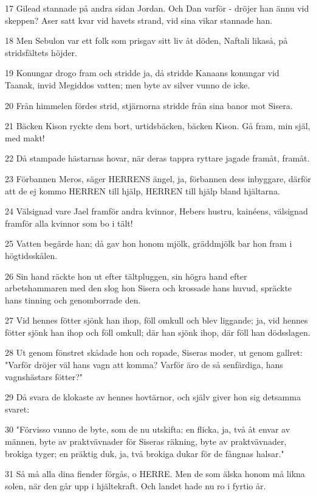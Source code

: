 \par 17 Gilead stannade på andra sidan Jordan. Och Dan varför - dröjer han ännu vid skeppen? Aser satt kvar vid havets strand, vid sina vikar stannade han.
\par 18 Men Sebulon var ett folk som prisgav sitt liv åt döden, Naftali likaså, på stridsfältets höjder.
\par 19 Konungar drogo fram och stridde ja, då stridde Kanaans konungar vid Taanak, invid Megiddos vatten; men byte av silver vunno de icke.
\par 20 Från himmelen fördes strid, stjärnorna stridde från sina banor mot Sisera.
\par 21 Bäcken Kison ryckte dem bort, urtidsbäcken, bäcken Kison. Gå fram, min själ, med makt!
\par 22 Då stampade hästarnas hovar, när deras tappra ryttare jagade framåt, framåt.
\par 23 Förbannen Meros, säger HERRENS ängel, ja, förbannen dess inbyggare, därför att de ej kommo HERREN till hjälp, HERREN till hjälp bland hjältarna.
\par 24 Välsignad vare Jael framför andra kvinnor, Hebers hustru, kainéens, välsignad framför alla kvinnor som bo i tält!
\par 25 Vatten begärde han; då gav hon honom mjölk, gräddmjölk bar hon fram i högtidsskålen.
\par 26 Sin hand räckte hon ut efter tältpluggen, sin högra hand efter arbetshammaren med den slog hon Sisera och krossade hans huvud, spräckte hans tinning och genomborrade den.
\par 27 Vid hennes fötter sjönk han ihop, föll omkull och blev liggande; ja, vid hennes fötter sjönk han ihop och föll omkull; där han sjönk ihop, där föll han dödsslagen.
\par 28 Ut genom fönstret skådade hon och ropade, Siseras moder, ut genom gallret: "Varför dröjer väl hans vagn att komma? Varför äro de så senfärdiga, hans vagnshästars fötter?"
\par 29 Då svara de klokaste av hennes hovtärnor, och själv giver hon sig detsamma svaret:
\par 30 "Förvisso vunno de byte, som de nu utskifta: en flicka, ja, två åt envar av männen, byte av praktvävnader för Siseras räkning, byte av praktvävnader, brokiga tyger; en präktig duk, ja, två brokiga dukar för de fångnas halsar."
\par 31 Så må alla dina fiender förgås, o HERRE. Men de som älska honom må likna solen, när den går upp i hjältekraft. Och landet hade nu ro i fyrtio år.

